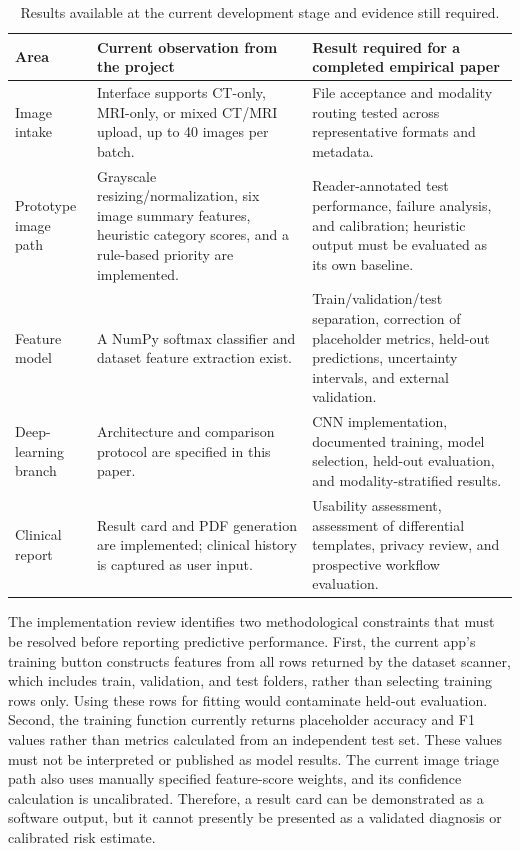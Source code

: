 \documentclass[10pt,a4paper]{article}
\begin{document}
\begin{table}[t]
\centering
\small
\caption{Results available at the current development stage and evidence still required.}
\label{tab:implementation-results}
\begin{tabular}{p{}p{}p{}}
\toprule
Area & Current observation from the project & Result required for a completed empirical paper \\
\midrule
Image intake & Interface supports CT-only, MRI-only, or mixed CT/MRI upload, up to 40 images per batch. & File acceptance and modality routing tested across representative formats and metadata. \\
Prototype image path & Grayscale resizing/normalization, six image summary features, heuristic category scores, and a rule-based priority are implemented. & Reader-annotated test performance, failure analysis, and calibration; heuristic output must be evaluated as its own baseline. \\
Feature model & A NumPy softmax classifier and dataset feature extraction exist. & Train/validation/test separation, correction of placeholder metrics, held-out predictions, uncertainty intervals, and external validation. \\
Deep-learning branch & Architecture and comparison protocol are specified in this paper. & CNN implementation, documented training, model selection, held-out evaluation, and modality-stratified results. \\
Clinical report & Result card and PDF generation are implemented; clinical history is captured as user input. & Usability assessment, assessment of differential templates, privacy review, and prospective workflow evaluation. \\
\bottomrule
\end{tabular}
\end{table}

The implementation review identifies two methodological constraints that must be resolved before reporting predictive performance. First, the current app's training button constructs features from all rows returned by the dataset scanner, which includes train, validation, and test folders, rather than selecting training rows only. Using these rows for fitting would contaminate held-out evaluation. Second, the training function currently returns placeholder accuracy and F1 values rather than metrics calculated from an independent test set. These values must not be interpreted or published as model results. The current image triage path also uses manually specified feature-score weights, and its confidence calculation is uncalibrated. Therefore, a result card can be demonstrated as a software output, but it cannot presently be presented as a validated diagnosis or calibrated risk estimate.
\end{document}
